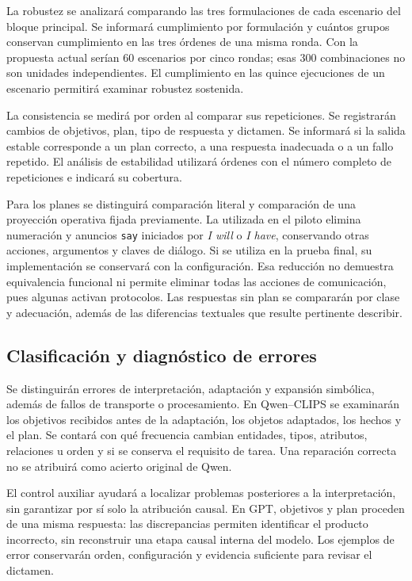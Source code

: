 La robustez se analizará comparando las tres formulaciones de cada
escenario del bloque principal. Se informará cumplimiento por formulación
y cuántos grupos conservan cumplimiento en las tres órdenes de una misma
ronda. Con la propuesta actual serían 60 escenarios por cinco rondas;
esas 300 combinaciones no son unidades independientes. El cumplimiento
en las quince ejecuciones de un escenario permitirá examinar robustez
sostenida.

La consistencia se medirá por orden al comparar sus repeticiones.
Se registrarán cambios de objetivos, plan, tipo de respuesta y dictamen.
Se informará si la salida estable corresponde a un plan correcto,
a una respuesta inadecuada o a un fallo repetido. El análisis de estabilidad
utilizará órdenes con el número completo de repeticiones e indicará
su cobertura.

Para los planes se distinguirá comparación literal y comparación de una
proyección operativa fijada previamente. La utilizada en el piloto elimina
numeración y anuncios \texttt{say} iniciados por \textit{I will} o
\textit{I have}, conservando otras acciones, argumentos y claves de diálogo.
Si se utiliza en la prueba final, su implementación se conservará con la
configuración. Esa reducción no demuestra equivalencia funcional ni permite
eliminar todas las acciones de comunicación, pues algunas activan protocolos.
Las respuestas sin plan se compararán por clase y adecuación, además de
las diferencias textuales que resulte pertinente describir.

\subsection{Clasificación y diagnóstico de errores}
\label{sec:errores_cap6}

Se distinguirán errores de interpretación, adaptación y expansión simbólica,
además de fallos de transporte o procesamiento. En Qwen--CLIPS se examinarán
los objetivos recibidos antes de la adaptación, los objetos adaptados,
los hechos y el plan. Se contará con qué frecuencia cambian entidades,
tipos, atributos, relaciones u orden y si se conserva el requisito de tarea.
Una reparación correcta no se atribuirá como acierto original de Qwen.

El control auxiliar ayudará a localizar problemas posteriores a la
interpretación, sin garantizar por sí solo la atribución causal. En GPT,
objetivos y plan proceden de una misma respuesta: las discrepancias
permiten identificar el producto incorrecto, sin reconstruir una etapa
causal interna del modelo. Los ejemplos de error conservarán orden,
configuración y evidencia suficiente para revisar el dictamen.


